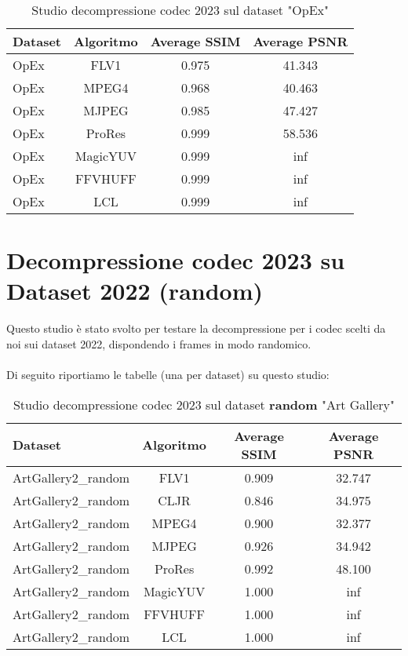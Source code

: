 \begin{table}[ht]
\centering
\begin{tabular}{|l|c|c|c|}
\hline
Dataset               & Algoritmo & Average SSIM & Average PSNR
\\ \hline
OpEx                  & FLV1      & 0.975        & 41.343       \\ \hline
OpEx                  & MPEG4     & 0.968        & 40.463       \\ \hline
OpEx                  & MJPEG     & 0.985        & 47.427       \\ \hline
OpEx                  & ProRes    & 0.999        & 58.536       \\ \hline
OpEx                  & MagicYUV  & 0.999        & inf          \\ \hline
OpEx                  & FFVHUFF   & 0.999        & inf          \\ \hline
OpEx                  & LCL       & 0.999        & inf          \\ \hline
\end{tabular}
\caption{Studio decompressione codec 2023 sul dataset "OpEx"}
\end{table}

\clearpage

\clearpage
\section{Decompressione codec 2023 su Dataset 2022 (random)}
Questo studio è stato svolto per testare la decompressione per i codec scelti da noi sui dataset 2022, dispondendo i frames in modo randomico.
\\
\\
Di seguito riportiamo le tabelle (una per dataset) su questo studio:

\begin{table}[ht]
\centering
\begin{tabular}{|l|c|c|c|}
\hline
Dataset               & Algoritmo & Average SSIM & Average PSNR
\\ \hline
ArtGallery2\_random   & FLV1      & 0.909        & 32.747       \\ \hline
ArtGallery2\_random   & CLJR      & 0.846        & 34.975       \\ \hline
ArtGallery2\_random   & MPEG4     & 0.900        & 32.377       \\ \hline
ArtGallery2\_random   & MJPEG     & 0.926        & 34.942       \\ \hline
ArtGallery2\_random   & ProRes    & 0.992        & 48.100       \\ \hline
ArtGallery2\_random   & MagicYUV  & 1.000        & inf          \\ \hline
ArtGallery2\_random   & FFVHUFF   & 1.000        & inf          \\ \hline
ArtGallery2\_random   & LCL       & 1.000        & inf          \\ \hline
\end{tabular}
\caption{Studio decompressione codec 2023 sul dataset \textbf{random} "Art Gallery"}
\end{table}

